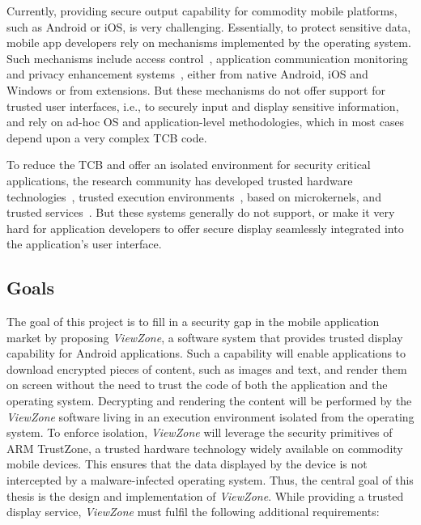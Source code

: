 Currently, providing secure output capability for commodity mobile platforms, such as Android or iOS, is very challenging. Essentially, to protect sensitive data, mobile app developers rely on mechanisms implemented by the operating system. Such mechanisms include access control~\cite{smalley2013security,bugiel2011practical,nauman2010apex,kern2012permission,conti2011crepe,russello2012moses,heuser2014asm,backes2014android,wang2015deepdroid,drm}, application communication monitoring~\cite{ongtang2012semantically,dietz2011quire,bugiel2011xmandroid} and privacy enhancement systems~\cite{beresford2011mockdroid,zhou2011taming,shebaro2014identidroid,enck2014taintdroid}, either from native Android, iOS and Windows or from extensions. But these mechanisms do not offer support for trusted user interfaces, i.e., to securely input and display sensitive information, and rely on ad-hoc \ac{OS} and application-level methodologies, which in most cases depend upon a very complex \ac{TCB} code.

To reduce the \ac{TCB} and offer an isolated environment for security critical applications, the research community has developed trusted hardware technologies~\cite{trustzone_whitepaper}, trusted execution environments~\cite{genode,t6_tee,knox_whitepaper,fitzekandix,kostiainen2012board,mcgillion2015open,sun2015trustice,santos2011trusted,sierra_tee,tlk,op_tee}, based on microkernels, and trusted services~\cite{li2014droidvault,brasserregulating,li2014building,li2015adattester,sun2015trustotp,sun2015reliable,aks}. But these systems generally do not support, or make it very hard for application developers to offer secure display seamlessly integrated into the application's user interface.

\subsection{Goals}
The goal of this project is to fill in a security gap in the mobile application market by proposing \emph{ViewZone}, a software system that provides trusted display capability for Android applications. Such a capability will enable applications to download encrypted pieces of content, such as images and text, and render them on screen without the need to trust the code of both the application and the operating system. Decrypting and rendering the content will be performed by the \emph{ViewZone} software living in an execution environment isolated from the operating system. To enforce isolation, \emph{ViewZone} will leverage the security primitives of ARM TrustZone, a trusted hardware technology widely available on commodity mobile devices. This ensures that the data displayed by the device is not intercepted by a malware-infected operating system. Thus, the central goal of this thesis is the design and implementation of \emph{ViewZone}. While providing a trusted display service, \emph{ViewZone} must fulfil the following additional requirements:

